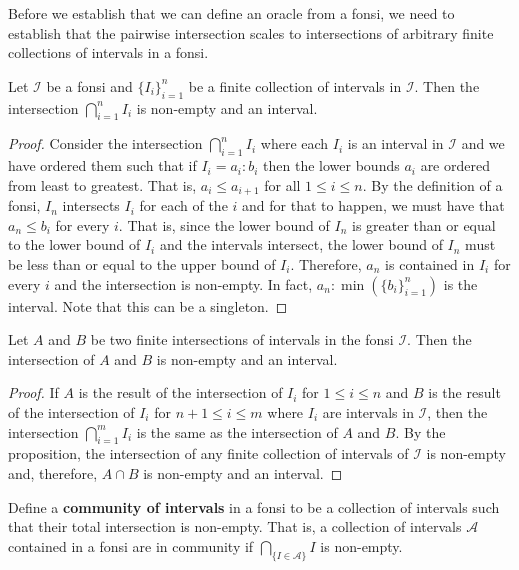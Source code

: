 \documentclass[12pt]{article}
\begin{document}
Before we establish that we can define an oracle from a fonsi, we need to establish that the pairwise intersection scales to intersections of arbitrary finite collections of intervals in a fonsi. 

\begin{proposition}
 Let $\mathcal{I}$ be a fonsi and $\{I_i\}_{i=1}^n$ be a finite collection of intervals in $\mathcal{I}$. Then the intersection $\bigcap_{i=1}^n I_i$ is non-empty and an interval.
\end{proposition}

\begin{proof} 
    Consider the intersection $\bigcap_{i=1}^n I_i$ where each $I_i$ is an interval in $\mathcal{I}$ and we have ordered them such that if $I_i = a_i : b_i$ then the lower bounds $a_i$ are ordered from least to greatest. That is,  $a_i \leq a_{i+1}$ for all $1 \leq i \leq n$. By the definition of a fonsi, $I_n$ intersects $I_i$ for each of the $i$ and for that to happen, we must have that $a_n \leq b_i$ for every $i$. That is, since the lower bound of $I_n$ is greater than or equal to the lower bound of $I_i$ and the intervals intersect, the lower bound of $I_n$ must be less than or equal to the upper bound of $I_i$. Therefore, $a_n$ is contained in $I_i$ for every $i$ and the intersection is non-empty. In fact, $a_n : \min(\{b_i\}_{i=1}^n)$ is the interval. Note that this can be a singleton. 
\end{proof}


\begin{corollary}
Let $A$ and $B$ be two finite intersections of intervals in the fonsi $\mathcal{I}$. Then the intersection of $A$ and $B$ is non-empty and an interval. 
\end{corollary}

\begin{proof}
    If $A$ is the result of the intersection of $I_i$ for $1 \leq i \leq n$ and $B$ is the result of the intersection of $I_i$ for $n+1 \leq i \leq m$ where $I_i$ are intervals in $\mathcal{I}$, then the intersection $\bigcap_{i=1}^m I_i$ is the same as the intersection of $A$ and $B$. By the proposition, the intersection of any finite collection of intervals of $\mathcal{I}$ is non-empty and, therefore, $A \cap B$ is non-empty and an interval. 
\end{proof}

Define a \textbf{community of intervals} in a fonsi to be  a collection of intervals such that their total intersection is non-empty. That is, a collection of intervals $\mathcal{A}$ contained in a fonsi are in community if $\bigcap_{\{I \in \mathcal{A}\}} I$ is non-empty. 
\end{document}
